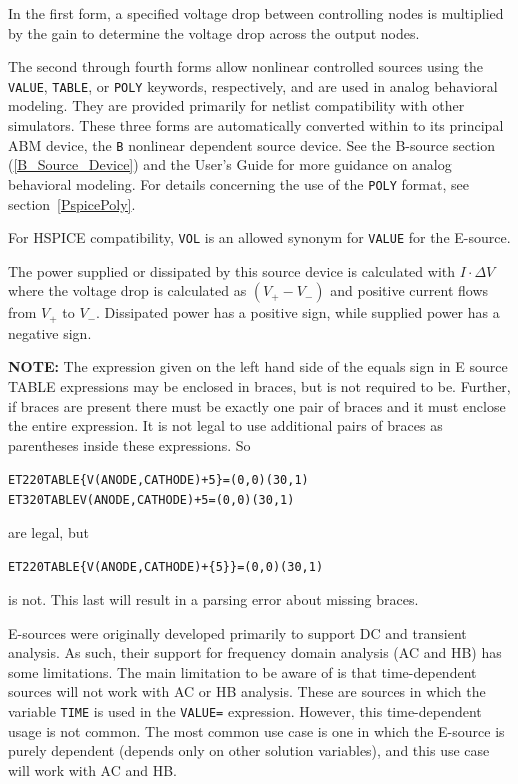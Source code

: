 \begin{Device}
\begin{Parameters}
\end{Parameters}

\comments 

In the first form, a specified voltage drop between controlling nodes is
multiplied by the gain to determine the voltage drop across the output nodes. 

The second through fourth forms allow nonlinear controlled sources using the
\texttt{VALUE}, \texttt{TABLE}, or \texttt{POLY} keywords, respectively, and
are used in analog behavioral modeling.  They are provided primarily for
netlist compatibility with other simulators.  These three forms are
automatically converted within \Xyce{} to its principal ABM device, the
\texttt{B} nonlinear dependent source device. See the B-source section
(\ref{B_Source_Device}) and the \Xyce{} User's Guide for more guidance on
analog behavioral modeling.  For details concerning the use of the
\texttt{POLY} format, see section~\ref{PspicePoly}.

For HSPICE compatibility, \texttt{VOL} is an allowed synonym for
\texttt{VALUE} for the E-source.

The power supplied or dissipated by this source device is calculated 
with $I \cdot \Delta V$ where the voltage drop is calculated as $(V_+ - V_-)$ 
and positive current flows from $V_+$ to $V_-$.  Dissipated power has a
positive sign, while supplied power has a negative sign.

{\bf NOTE:} The expression given on the left hand side of the equals
sign in E source TABLE expressions may be enclosed in braces, but is
not required to be.  Further, if braces are present there must be
exactly one pair of braces and it must enclose the entire expression.
It is not legal to use additional pairs of braces as parentheses
inside these expressions.  So
\begin{alltt}
ET2 2 0 TABLE \{V(ANODE,CATHODE)+5\} = (0,0) (30,1)
ET3 2 0 TABLE V(ANODE,CATHODE)+5 = (0,0) (30,1)
\end{alltt}
are legal, but 
\begin{alltt}
ET2 2 0 TABLE \{V(ANODE,CATHODE)+\{5\}\} = (0,0) (30,1)
\end{alltt}
is not.  This last will result in a parsing error about missing braces.

E-sources were originally developed primarily to support DC and transient analysis.  
As such, their support for frequency domain analysis (AC and HB) has some limitations.  
The main limitation to be aware of is that time-dependent sources will not work with AC or HB analysis.  
These are sources in which the variable \texttt{TIME} is used in the \texttt{VALUE=} expression. 
However, this time-dependent usage is not common.  The most 
common use case is one in which the E-source is purely dependent (depends only 
on other solution variables), and this use case will work with AC and HB.  

\end{Device}
